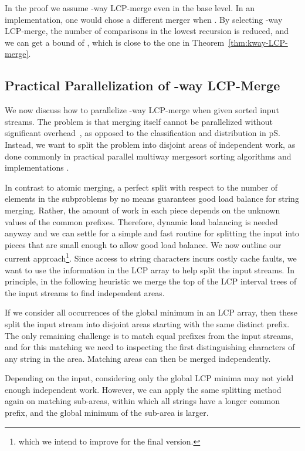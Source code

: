 \documentclass[a4paper]{myjournal}
\begin{document}
In the proof we assume -way LCP-merge even in the base level. In an
implementation, one would chose a different merger when . By selecting
-way LCP-merge, the number of comparisons in the lowest recursion is reduced,
and we can get a bound of , which is close to the
one in Theorem~\ref{thm:kway-LCP-merge}.

\subsection{Practical Parallelization of \texorpdfstring{}{K}-way LCP-Merge}\label{sec:merge-kway-parallel}

We now discuss how to parallelize -way LCP-merge when given  sorted input
streams. The problem is that merging itself cannot be parallelized without
significant overhead~\cite{cole1988parallel}, as opposed to the classification
and distribution in pS.  Instead, we want to split the problem into disjoint
areas of independent work, as done commonly in practical parallel
multiway mergesort sorting algorithms and implementations
\cite{akl1987optimal,singler2007mcstl}.

In contrast to atomic merging, a perfect split with respect to the number of
elements in the subproblems by no means guarantees good load balance for string
merging. Rather, the amount of work in each piece depends on the unknown values
of the common prefixes. Therefore, dynamic load balancing is needed anyway and
we can settle for a simple and fast routine for splitting the input into
pieces that are small enough to allow good load balance. We now outline our
current approach\footnote{which we intend to improve for the final version.}.
Since access to string characters
incurs costly cache faults, we want to use the information in the LCP array to
help split the input streams.  In principle, in the following heuristic we merge
the top of the LCP interval trees \cite{abouelhoda2004replacing} of the 
input streams to find independent areas.

If we consider all occurrences of the global minimum in an LCP array, then these
split the input stream into disjoint areas starting with the same distinct
prefix. The only remaining challenge is to match equal prefixes from the 
input streams, and for this matching we need to inspecting the first
distinguishing characters of any string in the area. Matching areas can then be
merged independently.

Depending on the input, considering only the global LCP minima may not yield
enough independent work. However, we can apply the same splitting method again
on matching sub-areas, within which all strings have a longer common prefix, and
the global minimum of the sub-area is larger.
\end{document}
